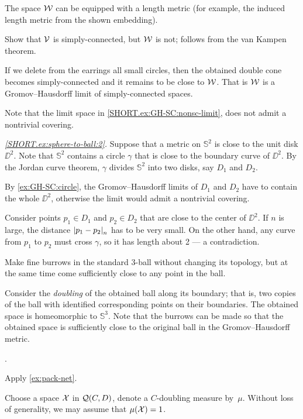 The space $\mathcal{W}$ can be equipped with a length metric
(for example, the induced length metric from the shown embedding).

Show that $\mathcal{V}$ is simply-connected, but $\mathcal{W}$ is not; follows from the van Kampen theorem.

If we delete from the earrings all small circles, then the obtained double cone becomes simply-connected and it remains to be close to $\mathcal{W}$.
That is $\mathcal{W}$ is a Gromov--Hausdorff limit of simply-connected spaces.

Note that the limit space in \ref{SHORT.ex:GH-SC:nonsc-limit}, does not admit a nontrivial covering.

\parbf{\ref{ex:sphere-to-ball},}
\textit{\ref{SHORT.ex:sphere-to-ball:2}.}
Suppose that a metric on $\mathbb{S}^2$ is close to the unit disk $\DD^2$.
Note that $\mathbb{S}^2$ contains a circle $\gamma$ that is close to the boundary curve of $\DD^2$.
By the Jordan curve theorem, $\gamma$ divides $\mathbb{S}^2$ into two disks, say $D_1$ and $D_2$.

By \ref{ex:GH-SC:circle}, the Gromov--Hausdorff limits of $D_1$ and $D_2$ have to contain the whole $\DD^2$, otherwise the limit would admit a nontrivial covering.

Consider points $p_1\in D_1$ and $p_2\in D_2$ that are close to the center of $\DD^2$.
If $n$ is large, the distance $\dist{p_1}{p_2}{n}$ has to be very small.
On the other hand, any curve from $p_1$ to $p_2$ must cross $\gamma$, so it has length about 2 --- a contradiction.

Make fine burrows in the standard 3-ball without changing its topology,
but at the same time come sufficiently close to any point in the ball.

Consider the \emph{doubling} of the obtained ball along its boundary;
that is, two copies of the ball with identified corresponding points on their boundaries.
The obtained space is homeomorphic to $\mathbb{S}^3$.
Note that the burrows can be made 
so that the obtained space is sufficiently close to the original ball 
in the Gromov--Hausdorff metric.

 \cite[Exercises 7.5.13 and 7.5.17]{burago-burago-ivanov}. 

 Apply \ref{ex:pack-net}.

Choose a space $\mathcal{X}$ in $\mathcal{Q}(C,D)$, denote a $C$-doubling measure by~$\mu$.
Without loss of generality, we may assume that $\mu(\spc{X})\z=1$.

